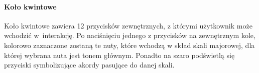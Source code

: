 
\paragraph{Koło kwintowe}

Koło kwintowe zawiera 12 przycisków zewnętrznych, z którymi użytkownik może wchodzić w~interakcję. Po naciśnięciu jednego z przycisków na zewnętrznym kole, kolorowo zaznaczone zostaną te nuty, które wchodzą w skład skali majorowej, dla której wybrana nuta jest tonem głównym. Ponadto na szaro podświetlą się przyciski symbolizujące akordy pasujące do danej skali.

